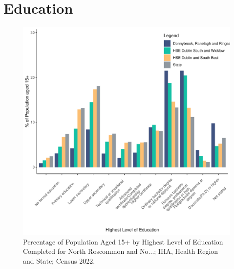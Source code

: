 \documentclass{article}
\begin{document}
\section{Education}\label{sect:Edu}
\begin{figure}[H]
	\centering
	\includegraphics[width = 120mm]{../figures/EduED.pdf}
	\caption{Percentage of Population Aged 15+ by Highest Level of Education Completed for North Roscommon and No...; IHA, Health Region and State; Census 2022.}
	\label{fig:vbnv}
	\end{figure}
\end{document}
